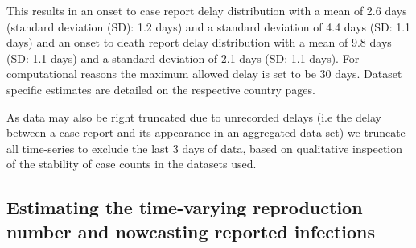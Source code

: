 \documentclass[
]{article}
\begin{document}
This results in an onset to case report delay distribution with a mean
of 2.6 days (standard deviation (SD): 1.2 days) and a standard deviation
of 4.4 days (SD: 1.1 days) and an onset to death report delay
distribution with a mean of 9.8 days (SD: 1.1 days) and a standard
deviation of 2.1 days (SD: 1.1 days). For computational reasons the
maximum allowed delay is set to be 30 days. Dataset specific estimates
are detailed on the respective country pages.

As data may also be right truncated due to unrecorded delays (i.e the
delay between a case report and its appearance in an aggregated data
set) we truncate all time-series to exclude the last 3 days of data,
based on qualitative inspection of the stability of case counts in the
datasets used.

\hypertarget{estimating-the-time-varying-reproduction-number-and-nowcasting-reported-infections}{%
\subsection{Estimating the time-varying reproduction number and
nowcasting reported
infections}\label{estimating-the-time-varying-reproduction-number-and-nowcasting-reported-infections}}
\end{document}

